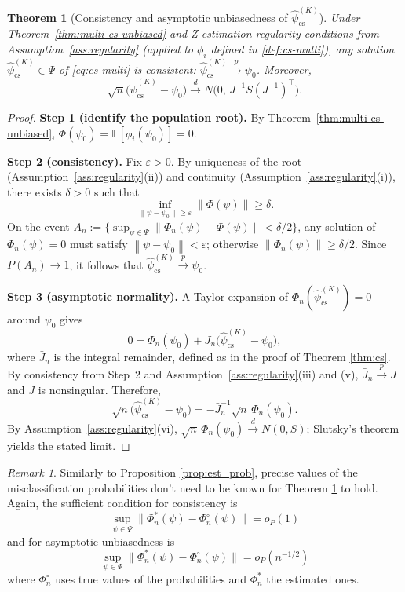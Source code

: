 \documentclass[11pt]{article}
\newtheorem{theorem}{Theorem}
\theoremstyle{definition}
\theoremstyle{remark}
\newtheorem{remark}{Remark}
\newcommand{\E}{\mathbb{E}}
\newcommand{\toP}{\xrightarrow{\,p\,}}
\newcommand{\tod}{\xrightarrow{\,d\,}}
\newcommand{\norm}[1]{\left\lVert #1 \right\rVert}
\begin{document}
\begin{theorem}[Consistency and asymptotic unbiasedness of $\hat\psi_{\mathrm{cs}}^{(K)}$]\label{thm:multi-cs}
Under Theorem~\ref{thm:multi-cs-unbiased} and Z-estimation regularity conditions from Assumption~\ref{ass:regularity} (applied to $\phi_i$ defined in \ref{def:cs-multi}),
any solution $\hat\psi_{\mathrm{cs}}^{(K)}\in \Psi$ of \eqref{eq:cs-multi} is consistent: $\hat\psi_{\mathrm{cs}}^{(K)}\toP\psi_0$.
Moreover,
\[
\sqrt{n}\big(\hat\psi_{\mathrm{cs}}^{(K)}-\psi_0\big)\tod N\big(0,\,J^{-1}S(J^{-1})^\top\big).
\]
\end{theorem}

\begin{proof}
\textbf{Step 1 (identify the population root).}
By Theorem~\ref{thm:multi-cs-unbiased}, $\Phi(\psi_0)=\E[\phi_i(\psi_0)]=0$.

\textbf{Step 2 (consistency).}
Fix $\varepsilon>0$. By uniqueness of the root (Assumption~\ref{ass:regularity}(ii)) and continuity (Assumption~\ref{ass:regularity}(i)),
there exists $\delta>0$ such that
\[
\inf_{\norm{\psi-\psi_0}\ge\varepsilon}\norm{\Phi(\psi)}\ge\delta.
\]
On the event $A_n:=\{\sup_{\psi\in\Psi}\norm{\Phi_n(\psi)-\Phi(\psi)}<\delta/2\}$, any solution of $\Phi_n(\psi)=0$
must satisfy $\norm{\psi-\psi_0}<\varepsilon$; otherwise $\norm{\Phi_n(\psi)}\ge \delta/2$.
Since $P(A_n)\to 1$, it follows that $\hat\psi_{\mathrm{cs}}^{(K)}\toP\psi_0$.

\textbf{Step 3 (asymptotic normality).}
A Taylor expansion of $\Phi_n(\hat\psi_{\mathrm{cs}}^{(K)})=0$ around $\psi_0$ gives
\[
0=\Phi_n(\psi_0)+\bar J_n\big(\hat\psi_{\mathrm{cs}}^{(K)}-\psi_0\big),
\]
where $\bar J_n$ is the integral remainder, defined as in the proof of  Theorem \ref{thm:cs}.
By consistency from Step~2 and Assumption~\ref{ass:regularity}(iii) and (v), $\bar J_n \toP J$ and $J$ is nonsingular.
Therefore,
\[
\sqrt{n}\big(\hat\psi_{\mathrm{cs}}^{(K)}-\psi_0\big)
=-\bar J_n^{-1}\sqrt{n}\,\Phi_n(\psi_0).
\]
By Assumption~\ref{ass:regularity}(vi), $\sqrt{n}\,\Phi_n(\psi_0)\tod N(0,S)$; Slutsky's theorem yields the stated limit.
\end{proof}

\begin{remark}
    Similarly to Proposition \ref{prop:est_prob}, precise values of the misclassification probabilities don't need to be known for Theorem \ref{thm:multi-cs} to hold. Again, the sufficient condition for consistency is 
    \[ \sup_{\psi \in \Psi}\|\Phi_n^*(\psi) - \Phi_n^\circ(\psi) \| = o_P(1) \]
    and for asymptotic unbiasedness is
    \[ \sup_{\psi \in \Psi}\|\Phi_n^*(\psi) - \Phi_n^\circ(\psi) \| = o_P(n^{-1/2}) \]
    where $\Phi_n^\circ$ uses true values of the probabilities and $\Phi_n^*$ the estimated ones.
\end{remark}
\end{document}
